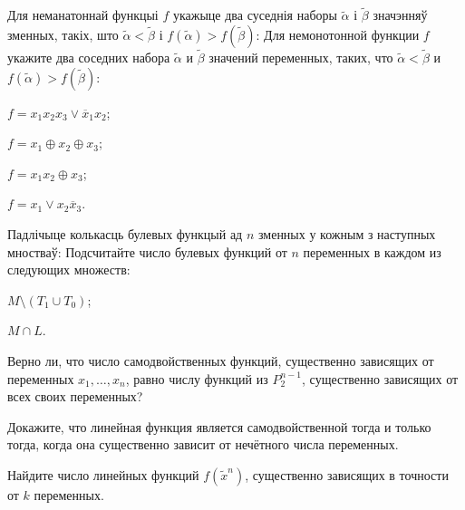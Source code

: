 \documentclass[12pt, a4paper]{article}
\begin{document}
\begin{problemList}
\problemItemWithCommonPart
{Для неманатоннай функцыі $f$ укажыце два суседнія наборы $\tilde\alpha$ і $\tilde\beta$ значэнняў зменных,
такіх, што $\tilde\alpha < \tilde\beta$ і $f(\tilde\alpha) > f(\tilde\beta)$:}
{Для немонотонной функции $f$ укажите два соседних набора $\tilde\alpha$ и $\tilde\beta$ значений переменных,
таких, что $\tilde\alpha < \tilde\beta$ и $f(\tilde\alpha) > f(\tilde\beta)$:}
{%
\begin{belarusianEnumerateMulticol}
    \item $f=x_1x_2x_3\vee \overline{x}_1x_2$;
    \item $f=x_1\oplus x_2\oplus x_3$;
    \item $f=x_1x_2\oplus x_3$;
    \item $f=x_1\vee x_2\overline{x}_3$.
\end{belarusianEnumerateMulticol}
}

\smallskip

\problemItemWithCommonPart
{Падлічыце колькасць булевых функцый ад $n$ зменных у кожным з наступных мностваў:}
{Подсчитайте число булевых функций от $n$ переменных в каждом из следующих множеств:}
{%
\begin{belarusianEnumerateMulticol}
    \item $M\setminus(T_1 \cup T_0)$;
    \item $M \cap L$.
\end{belarusianEnumerateMulticol}
}

\smallskip

{Верно ли, что число самодвойственных функций, существенно зависящих от переменных $x_1, \ldots, x_n$,
равно числу функций из $P_2^{n-1}$, существенно зависящих от всех своих переменных?}

\bigskip

{Докажите, что линейная функция является самодвойственной тогда и только тогда,
когда она существенно зависит от нечётного числа переменных.}

\bigskip

{Найдите число линейных функций $f(\tilde x^n)$, существенно зависящих в точности от $k$ переменных.}


\end{problemList}
\end{document}
